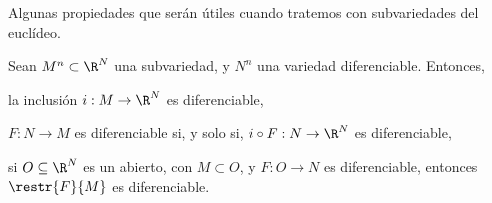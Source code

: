 Algunas propiedades que serán útiles cuando tratemos con subvariedades del euclídeo.
\begin{nprop} \label{prop:prop-dif-sub}
  Sean $M^{n}\subset\R^{N}$ una subvariedad, y $N^{n}$ una variedad
  diferenciable. Entonces,
  \begin{nlist}
  \item \label{item:inc}
    la inclusión $i: M\to\R^{N}$ es diferenciable,
  \item \label{item:inc-2}
    $F: N\to M$ es diferenciable si, y solo si, $i\circ F: N\to\R^{N}$ es
    diferenciable,
  \item \label{item:restr-dif}
    si $O\subseteq\R^{N}$ es un abierto, con $M\subset O$, y $F: O\to N$ es
    diferenciable, entonces $\restr{F}{M}$ es diferenciable.
  \end{nlist}
\end{nprop}
